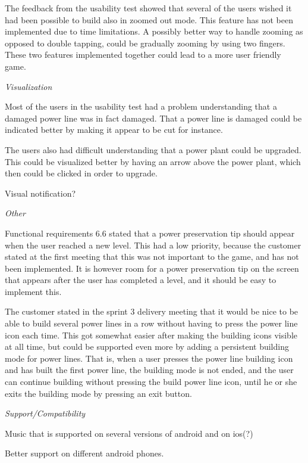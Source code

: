 The feedback from the usability test showed that several of the users wished it had been 
possible to build also in zoomed out mode. This feature has not been implemented due to 
time limitations. A possibly better way to handle zooming as opposed to double tapping, 
could be gradually zooming by using two fingers. These two features implemented together 
could lead to a more user friendly game.

\textit{Visualization}

Most of the users in the usability test had a problem understanding that a damaged power 
line was in fact damaged. That a power line is damaged could be indicated better by making 
it appear to be cut for instance.

The users also had difficult understanding that a power plant could be upgraded. This could 
be visualized better by having an arrow above the power plant, which then could be clicked in 
order to upgrade.

Visual notification?

\textit{Other}

Functional requirements 6.6 stated that a power preservation tip should appear when the user 
reached a new level. This had a low priority, because the customer stated at the first meeting 
that this was not important to the game, and has not been implemented. It is however room for a 
power preservation tip on the screen that appears after the user has completed a level, and it 
should be easy to implement this.

The customer stated in the sprint 3 delivery meeting that it would be nice to be able to build 
several power lines in a row without having to press the power line icon each time. This got 
somewhat easier after making the building icons visible at all time, but could be supported even 
more by adding a persistent building mode for power lines. That is, when a user presses the power 
line building icon and has built the first power line, the building mode is not ended, and the user 
can continue building without pressing the build power line icon, until he or she exits the building 
mode by pressing an exit button.

\textit{Support/Compatibility}

Music that is supported on several versions of android and on ios(?)

Better support on different android phones.
